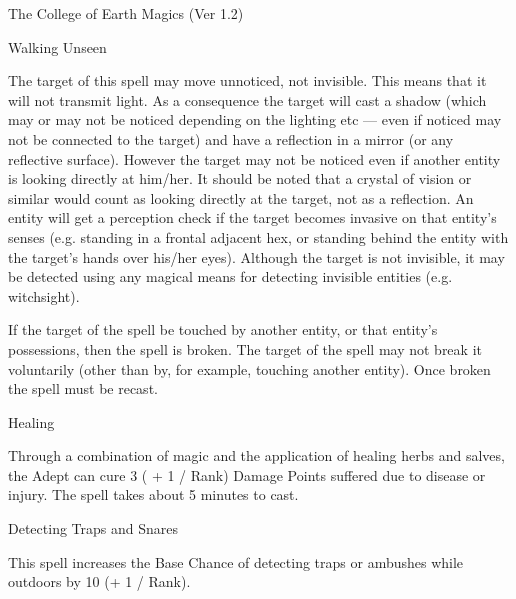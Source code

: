 \begin{Chapter}{The College of Earth Magics (Ver 1.2)}
\begin{spell}[G-5]{Walking Unseen }
\begin{effects}
The target of this spell may move unnoticed, not invisible.  This
means that it will not transmit light. As a consequence the target
will cast a shadow (which may or may not be noticed depending on the
lighting etc — even if noticed may not be connected to the target) and
have a reflection in a mirror (or any reflective surface).  However
the target may not be noticed even if another entity is looking
directly at him/her.  It should be noted that a crystal of vision or
similar would count as looking directly at the target, not as a
reflection.  An entity will get a perception check if the target
becomes invasive on that entity’s senses (e.g. standing in a frontal
adjacent hex, or standing behind the entity with the target’s hands
over his/her eyes). Although the target is not invisible, it may be
detected using any magical means for detecting invisible entities
(e.g. witchsight).

If the target of the spell be touched by another entity, or that
entity’s possessions, then the spell is broken.  The target of the
spell may not break it voluntarily (other than by, for example,
touching another entity).  Once broken the spell must be recast.

\end{effects}
\end{spell}

\begin{spell}[G-6]{Healing }
\begin{effects}
Through a combination of magic and the application of healing herbs
and salves, the Adept can cure 3 ( + 1 / Rank) Damage Points suffered
due to disease or injury.  The spell takes about 5 minutes to cast.
\end{effects}
\end{spell}

\begin{spell}[G-7]{Detecting Traps and Snares }

\begin{effects}
This spell increases the Base Chance of detecting traps or ambushes
while outdoors by 10 (+ 1 / Rank).
\end{effects}
\end{spell}


\end{Chapter}
